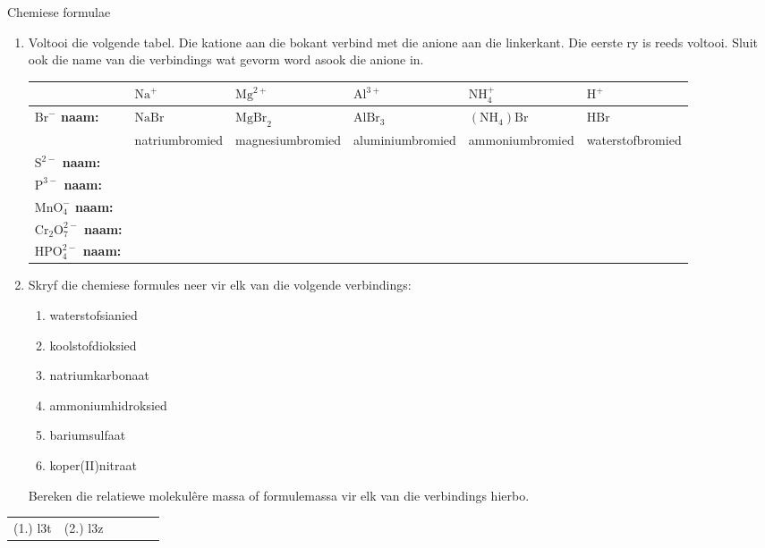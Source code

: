 \begin{exercises}{Chemiese formulae }
{
            \nopagebreak
        \label{m38689*id145052}\begin{enumerate}[noitemsep, label=\textbf{\arabic*}. ] 
            \label{m38689*uid100}\item 
Voltooi die volgende tabel. Die katione aan die bokant verbind met die anione aan die linkerkant. Die eerste ry is reeds voltooi. Sluit ook die name van die verbindings wat gevorm word asook die anione in.
          \begin{table}[H]
        \begin{center}
      \label{m38689*id145067}
    \noindent
      \begin{tabular}{|p{1cm}|p{2.5cm}|p{2.5cm}|p{2.5cm}|p{2.5cm}|p{2.5cm}|}\hline
        &\textbf{ $\text{Na}^{+}$} & \textbf{$\text{Mg}^{2+}$} & \textbf{$\text{Al}^{3+}$} & \textbf{$\text{NH}_{4}^{+}$} & \textbf{$\text{H}^{+}$} \\ \hline
\multirow{2}{1cm}{\textbf{$\text{Br}^{-}$ naam:}} & $\text{NaBr}$  & $\text{MgBr}_2$  & $\text{AlBr}_3$  & $(\text{NH}_{4})\text{Br}$  & $\mathrm{HBr}$  \\ 
 & natriumbromied & magnesiumbromied & aluminiumbromied & ammoniumbromied & waterstofbromied \\ \hline
\textbf{$\text{S}^{2-}$ naam:} & & & & & \\ \hline
\textbf{$\text{P}^{3-}$ naam:} & & & & & \\ \hline
\textbf{$\text{MnO}_{4}^{-}$ naam:} & & & & & \\ \hline
\textbf{$\text{Cr}_{2}\text{O}_{7}^{2-}$ naam:} & & & & & \\ \hline
\textbf{$\text{HPO}_{4}^{2-}$ naam:} & & & & & \\ \hline
    \end{tabular}
      \end{center}
\end{table}
    \par
          \label{m38689*uid101}\item Skryf die chemiese formules neer vir elk van die volgende verbindings:
\label{m38689*id145444}\begin{enumerate}[noitemsep, label=\textbf{\alph*}. ] 
            \label{m38689*uid102}\item waterstofsianied
\label{m38689*uid103}\item koolstofdioksied
\label{m38689*uid104}\item natriumkarbonaat
\label{m38689*uid105}\item ammoniumhidroksied
\label{m38689*uid106}\item bariumsulfaat
\item koper(II)nitraat
\end{enumerate}
Bereken die relatiewe molekul\^{e}re massa of formulemassa vir elk van die verbindings hierbo.
                \end{enumerate}

\practiceinfo
\begin{tabular}[h]{cccccc}
 (1.) l3t  &  (2.) l3z  &
\end{tabular}
}
\end{exercises}
